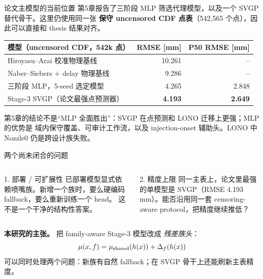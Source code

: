 \documentclass[UTF8,aspectratio=169]{ctexbeamer}
\begin{document}
\begin{frame}{论文主模型的当前位置}
\small
第5章报告了三阶段 MLP 筛选代理模型，以及一个 SVGP 替代骨干。这里仍使用同一张
\textbf{保守 uncensored CDF 点表}（542{,}565 个点），因此可以直接和 thesis 结果对齐。

\vspace{0.3em}
\begin{center}
\renewcommand{\arraystretch}{1.15}
\setlength{\tabcolsep}{5.5pt}
\begin{tabular}{@{}lrr@{}}
\toprule
\textbf{模型（uncensored CDF，542k 点）} & \textbf{RMSE [mm]} & \textbf{P50 RMSE [mm]} \\
\midrule
Hiroyasu--Arai 校准物理基线 & 10.261 & -- \\
Naber--Siebers + delay 物理基线 & 9.286 & -- \\
三阶段 MLP，5-seed 选定模型 & 4.265 & 2.848 \\
\rowcolor{softrow}
Stage-3 SVGP（论文最强点预测器） & \textbf{4.193} & \textbf{2.649} \\
\bottomrule
\end{tabular}
\end{center}

\vspace{0.35em}
\footnotesize
第5章的结论不是“MLP 全面胜出”：SVGP 在点预测和 LONO 迁移上更强；MLP 的优势是
域内保守覆盖、可审计工作流，以及 injection-onset 辅助头。LONO 中 Nozzle0 仍是跨设计族失败。
\end{frame}

\begin{frame}{两个尚未闭合的问题}
\small
\begin{columns}[T]
\begin{block}{1. 部署 / 可扩展性}
已部署模型显式依赖喷嘴族。新增一个族时，要么硬编码 fallback，要么重新训练一个 head。
这不是一个干净的结构性答案。
\end{block}

\begin{block}{2. 精度上限}
同一主表上，论文里最强的单模型是 SVGP（RMSE 4.193 mm）。能否沿用同一套
censoring-aware protocol，把精度继续推低？
\end{block}
\end{columns}

\vspace{0.55em}
\textbf{本研究的主张。} 把 family-aware Stage-3 模型改成
\emph{残差族头}：
\[
  \mu(x,f)=\mu_{\rm shared}(h(x))+\Delta_f(h(x))
\]
可以同时处理两个问题：新族有自然 fallback；在 SVGP 骨干上还能刷新主表精度。
\end{frame}
\end{document}
